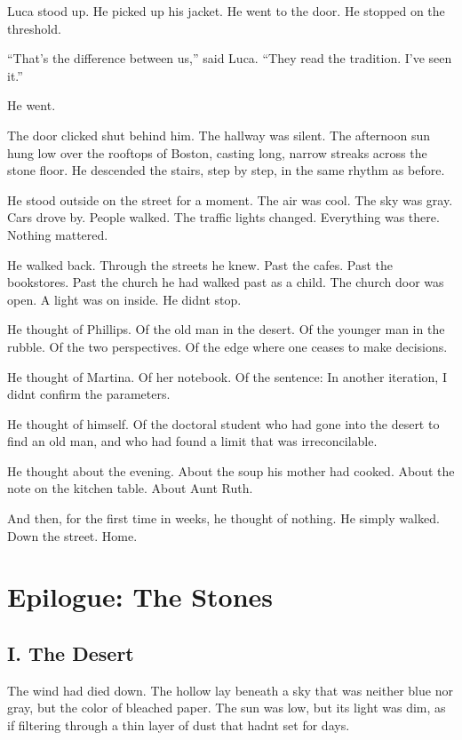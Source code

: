 \documentclass[
  ngerman,
]{article}
\begin{document}
Luca stood up. He picked up his jacket. He went to the door. He stopped
on the threshold.

``That's the difference between us,'' said Luca. ``They read the
tradition. I've seen it.''

He went.

The door clicked shut behind him. The hallway was silent. The afternoon
sun hung low over the rooftops of Boston, casting long, narrow streaks
across the stone floor. He descended the stairs, step by step, in the
same rhythm as before.

He stood outside on the street for a moment. The air was cool. The sky
was gray. Cars drove by. People walked. The traffic lights changed.
Everything was there. Nothing mattered.

He walked back. Through the streets he knew. Past the cafes. Past the
bookstores. Past the church he had walked past as a child. The church
door was open. A light was on inside. He didn\textquotesingle t stop.

He thought of Phillips. Of the old man in the desert. Of the younger man
in the rubble. Of the two perspectives. Of the edge where one ceases to
make decisions.

He thought of Martina. Of her notebook. Of the sentence: In another
iteration, I didn\textquotesingle t confirm the parameters.

He thought of himself. Of the doctoral student who had gone into the
desert to find an old man, and who had found a limit that was
irreconcilable.

He thought about the evening. About the soup his mother had cooked.
About the note on the kitchen table. About Aunt Ruth.

And then, for the first time in weeks, he thought of nothing. He simply
walked. Down the street. Home.

\section{Epilogue: The Stones}\label{epilogue-the-stones}

\subsection{I. The Desert}\label{i.-the-desert}

The wind had died down. The hollow lay beneath a sky that was neither
blue nor gray, but the color of bleached paper. The sun was low, but its
light was dim, as if filtering through a thin layer of dust that
hadn\textquotesingle t set for days.
\end{document}
